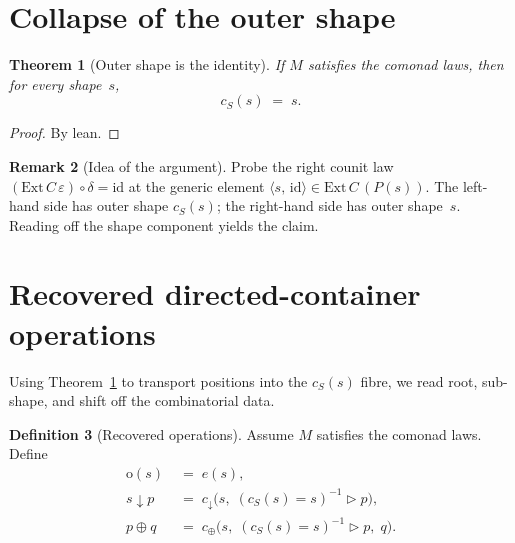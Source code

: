 \documentclass[11pt,a4paper]{article}
\theoremstyle{plain}
\newtheorem{theorem}{Theorem}[section]
\theoremstyle{definition}
\newtheorem{definition}[theorem]{Definition}
\newtheorem{remark}[theorem]{Remark}
\newcommand{\Ext}{\mathrm{Ext}}
\newcommand{\id}{\mathrm{id}}
\newcommand{\rootp}{\mathrm{o}}
\begin{document}
\section{Collapse of the outer shape}

\begin{theorem}[Outer shape is the identity]\label{thm:cshape-eq}
If $M$ satisfies the comonad laws, then for every shape~$s$,
\begin{equation}
  c_S(s) \;=\; s.
\end{equation}
\end{theorem}

\begin{proof}
By lean.
\end{proof}

\begin{remark}[Idea of the argument]
Probe the right counit law $(\Ext\,C\,\varepsilon) \circ \delta = \id$ at the
generic element $\langle s,\, \id\rangle \in \Ext\,C\,(P(s))$. The left-hand
side has outer shape $c_S(s)$; the right-hand side has outer shape~$s$. Reading
off the shape component yields the claim.
\end{remark}

\section{Recovered directed-container operations}

Using Theorem~\ref{thm:cshape-eq} to transport positions into the $c_S(s)$
fibre, we read root, sub-shape, and shift off the combinatorial data.

\begin{definition}[Recovered operations]\label{def:recovered}
Assume $M$ satisfies the comonad laws. Define
\begin{align}
  \rootp(s) &\;=\; e(s), \\[4pt]
  s \downarrow p
  &\;=\;
  c_{\downarrow}\bigl(s,\; (c_S(s)=s)^{-1} \mathbin{\triangleright} p\bigr),
  \\[4pt]
  p \oplus q
  &\;=\;
  c_{\oplus}\bigl(s,\;
    (c_S(s)=s)^{-1} \mathbin{\triangleright} p,\; q\bigr).
\end{align}
\end{definition}
\end{document}
